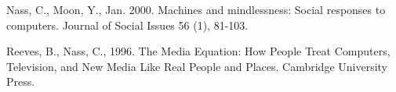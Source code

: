 \documentclass{acm_proc_article-sp}
\begin{document}
\begin{thebibliography}{99}
Nass, C., Moon, Y., Jan. 2000. Machines and mindlessness: Social responses to computers.
Journal of Social Issues 56 (1), 81-103.

Reeves, B., Nass, C., 1996. The Media Equation: How People Treat Computers, Television, and
New Media Like Real People and Places. Cambridge University Press.





\end{thebibliography}


%
%
\end{document}
